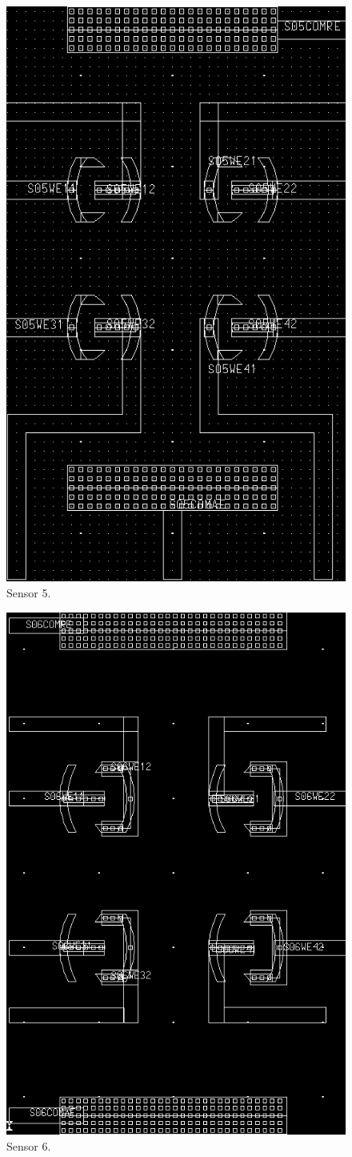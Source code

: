 \begin{figure}
	\centering
	\includegraphics[width=0.7\linewidth]{figures/s05.png}
	\caption{Sensor 5.}
	\label{s05}
\end{figure}

\begin{figure}
	\centering
	\includegraphics[width=0.7\linewidth]{figures/s06.png}
	\caption{Sensor 6.}
	\label{s06}
\end{figure}


